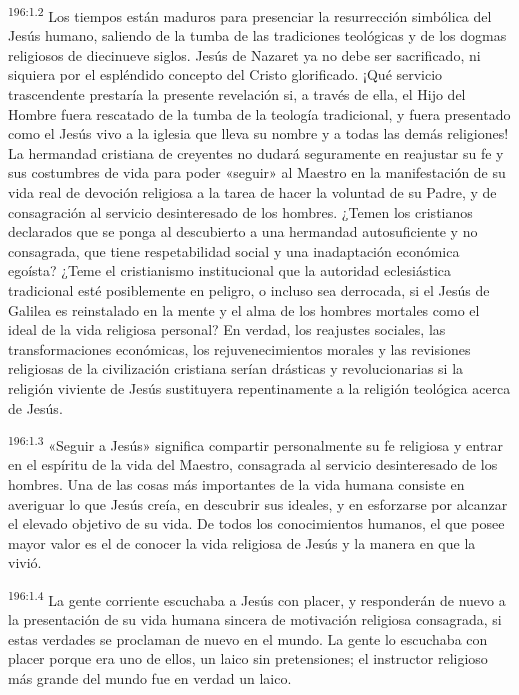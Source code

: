 \par 
\textsuperscript{196:1.2} Los tiempos están maduros para presenciar la resurrección simbólica del Jesús humano, saliendo de la tumba de las tradiciones teológicas y de los dogmas religiosos de diecinueve siglos. Jesús de Nazaret ya no debe ser sacrificado, ni siquiera por el espléndido concepto del Cristo glorificado. ¡Qué servicio trascendente prestaría la presente revelación si, a través de ella, el Hijo del Hombre fuera rescatado de la tumba de la teología tradicional, y fuera presentado como el Jesús vivo a la iglesia que lleva su nombre y a todas las demás religiones! La hermandad cristiana de creyentes no dudará seguramente en reajustar su fe y sus costumbres de vida para poder «seguir» al Maestro en la manifestación de su vida real de devoción religiosa a la tarea de hacer la voluntad de su Padre, y de consagración al servicio desinteresado de los hombres. ¿Temen los cristianos declarados que se ponga al descubierto a una hermandad autosuficiente y no consagrada, que tiene respetabilidad social y una inadaptación económica egoísta? ¿Teme el cristianismo institucional que la autoridad eclesiástica tradicional esté posiblemente en peligro, o incluso sea derrocada, si el Jesús de Galilea es reinstalado en la mente y el alma de los hombres mortales como el ideal de la vida religiosa personal? En verdad, los reajustes sociales, las transformaciones económicas, los rejuvenecimientos morales y las revisiones religiosas de la civilización cristiana serían drásticas y revolucionarias si la religión viviente de Jesús sustituyera repentinamente a la religión teológica acerca de Jesús.

\par 
\textsuperscript{196:1.3} «Seguir a Jesús» significa compartir personalmente su fe religiosa y entrar en el espíritu de la vida del Maestro, consagrada al servicio desinteresado de los hombres. Una de las cosas más importantes de la vida humana consiste en averiguar lo que Jesús creía, en descubrir sus ideales, y en esforzarse por alcanzar el elevado objetivo de su vida. De todos los conocimientos humanos, el que posee mayor valor es el de conocer la vida religiosa de Jesús y la manera en que la vivió.

\par 
\textsuperscript{196:1.4} La gente corriente escuchaba a Jesús con placer, y responderán de nuevo a la presentación de su vida humana sincera de motivación religiosa consagrada, si estas verdades se proclaman de nuevo en el mundo. La gente lo escuchaba con placer porque era uno de ellos, un laico sin pretensiones; el instructor religioso más grande del mundo fue en verdad un laico.

